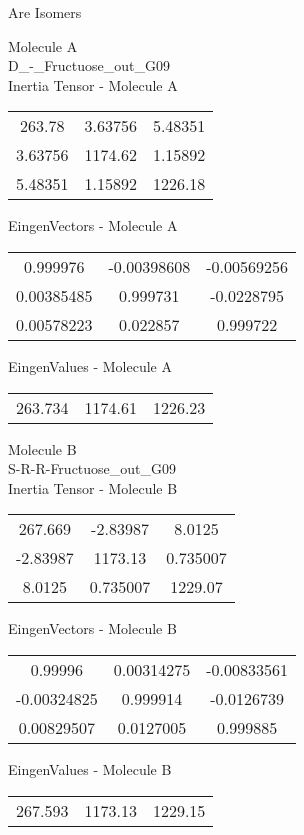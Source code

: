 \begin{center}
\vtab
\vtab
\textcolor{NavyBlue}{\Large Are Isomers}
\end{center}
\newpage
\begin{multicols}{2}
\begin{center}
Molecule A \\ 
D\_-\_Fructuose\_out\_G09
\\
Inertia Tensor - Molecule A \\
\vtab
\begin{tabular}{|c c c|}
263.78	 & 	3.63756	 & 	5.48351	 \\
3.63756	 & 	1174.62	 & 	1.15892	 \\
5.48351	 & 	1.15892	 & 	1226.18
\end{tabular}

\vtab
 EingenVectors - Molecule A     \\
\vtab
\begin{tabular}{|c c c|}
0.999976	 & 	-0.00398608	 & 	-0.00569256	 \\
0.00385485	 & 	0.999731	 & 	-0.0228795	 \\
0.00578223	 & 	0.022857	 & 	0.999722
\end{tabular}

\vtab
 EingenValues - Molecule A     \\
\vtab
\begin{tabular}{|c c c|}
263.734	 & 	1174.61	 & 	1226.23
\end{tabular}
\columnbreak

Molecule B \\ 
S-R-R-Fructuose\_out\_G09
\\
Inertia Tensor - Molecule B \\
\vtab
\begin{tabular}{|c c c|}
267.669	 & 	-2.83987	 & 	8.0125	 \\
-2.83987	 & 	1173.13	 & 	0.735007	 \\
8.0125	 & 	0.735007	 & 	1229.07
\end{tabular}

\vtab
 EingenVectors - Molecule B     \\
\vtab
\begin{tabular}{|c c c|}
0.99996	 & 	0.00314275	 & 	-0.00833561	 \\
-0.00324825	 & 	0.999914	 & 	-0.0126739	 \\
0.00829507	 & 	0.0127005	 & 	0.999885
\end{tabular}

\vtab
 EingenValues - Molecule B     \\
\vtab
\begin{tabular}{|c c c|}
267.593	 & 	1173.13	 & 	1229.15
\end{tabular}

\end{center}
\end{multicols}
